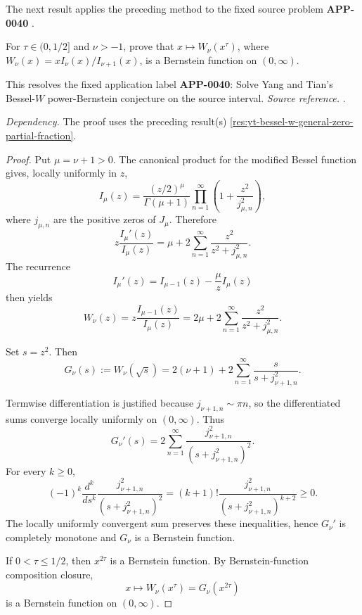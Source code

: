 The next result applies the preceding method to the fixed source problem \textbf{APP-0040} \cite{app-app-0040-source}.
\begin{corollary}
\label{res:yt-bessel-w-power-bernstein-conjecture}
For \(\tau\in(0,1/2]\) and \(\nu>-1\), prove that \(x\mapsto W_\nu(x^\tau)\), where \(W_\nu(x)=xI_\nu(x)/I_{\nu+1}(x)\), is a Bernstein function on \((0,\infty)\).

This resolves the fixed application label \textbf{APP-0040}: Solve Yang and Tian's Bessel-\(W\) power-Bernstein conjecture on the source interval.
\emph{Source reference.} \cite{app-app-0040-source}.

\emph{Dependency.} The proof uses the preceding result(s) \ref{res:yt-bessel-w-general-zero-partial-fraction}.
\end{corollary}
\begin{proof}
Put \(\mu=\nu+1>0\). The canonical product for the modified Bessel function gives, locally uniformly in \(z\),
\[
I_\mu(z)=\frac{(z/2)^\mu}{\Gamma(\mu+1)}
\prod_{n=1}^{\infty}\left(1+\frac{z^2}{j_{\mu,n}^2}\right),
\]
where \(j_{\mu,n}\) are the positive zeros of \(J_\mu\). Therefore
\[
z\frac{I_\mu'(z)}{I_\mu(z)}
=\mu+2\sum_{n=1}^{\infty}\frac{z^2}{z^2+j_{\mu,n}^2}.
\]
The recurrence
\[
I_\mu'(z)=I_{\mu-1}(z)-\frac{\mu}{z}I_\mu(z)
\]
then yields
\[
W_\nu(z)
=z\frac{I_{\mu-1}(z)}{I_\mu(z)}
=2\mu+2\sum_{n=1}^{\infty}\frac{z^2}{z^2+j_{\mu,n}^2}.
\]

Set \(s=z^2\). Then
\[
G_\nu(s):=W_\nu(\sqrt s)
=2(\nu+1)+2\sum_{n=1}^{\infty}\frac{s}{s+j_{\nu+1,n}^2}.
\]

Termwise differentiation is justified because \(j_{\nu+1,n}\sim \pi n\), so the differentiated sums converge locally uniformly on \((0,\infty)\). Thus
\[
G_\nu'(s)
=2\sum_{n=1}^{\infty}
\frac{j_{\nu+1,n}^2}{(s+j_{\nu+1,n}^2)^2}.
\]
For every \(k\ge0\),
\[
(-1)^k\frac{d^k}{ds^k}
\frac{j_{\nu+1,n}^2}{(s+j_{\nu+1,n}^2)^2}
=
(k+1)!\frac{j_{\nu+1,n}^2}{(s+j_{\nu+1,n}^2)^{k+2}}
\ge0.
\]
The locally uniformly convergent sum preserves these inequalities, hence \(G_\nu'\) is completely monotone and \(G_\nu\) is a Bernstein function.

If \(0<\tau\le1/2\), then \(x^{2\tau}\) is a Bernstein function. By Bernstein-function composition closure,
\[
x\mapsto W_\nu(x^\tau)=G_\nu(x^{2\tau})
\]
is a Bernstein function on \((0,\infty)\).
\end{proof}

